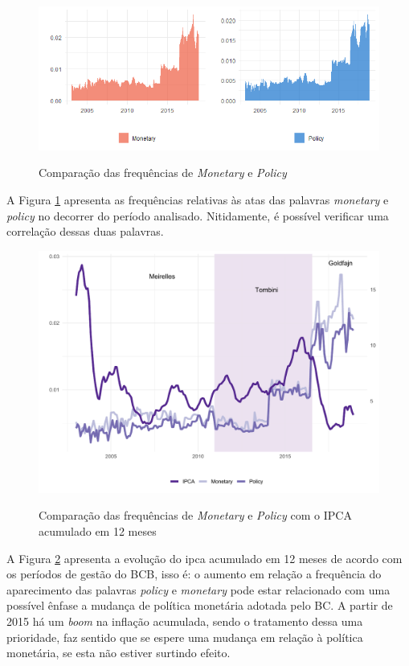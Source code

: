 \begin{figure}[!h]
    \centering
    \caption{Comparação das frequências de \textit{Monetary} e \textit{Policy}}
    \includegraphics[width=\textwidth]{capitulos/figures/policy_monetary_ggplot.pdf}
    \label{fig:monetarypolicy}
\end{figure}

A Figura \ref{fig:monetarypolicy} apresenta as frequências relativas às atas das palavras \textit{monetary} e \textit{policy} no decorrer do período analisado. Nitidamente, é possível verificar uma correlação dessas duas palavras. 

\begin{figure}[!h]
    \centering
    \caption{Comparação das frequências de \textit{Monetary} e \textit{Policy} com o IPCA acumulado em 12 meses}
    \includegraphics[width=\textwidth]{capitulos/figures/graficoipcapolicy.pdf}
    \label{fig:monpolipca}
\end{figure}

A Figura \ref{fig:monpolipca} apresenta a evolução do ipca acumulado em 12 meses de acordo com os períodos de gestão do BCB, isso é: o aumento em relação a frequência do aparecimento das palavras \textit{policy} e \textit{monetary} pode estar relacionado com uma possível ênfase a mudança de política monetária adotada pelo BC. A partir de 2015 há um \textit{boom} na inflação acumulada, sendo o tratamento dessa uma prioridade, faz sentido que se espere uma mudança em relação à política monetária, se esta não estiver surtindo efeito.

